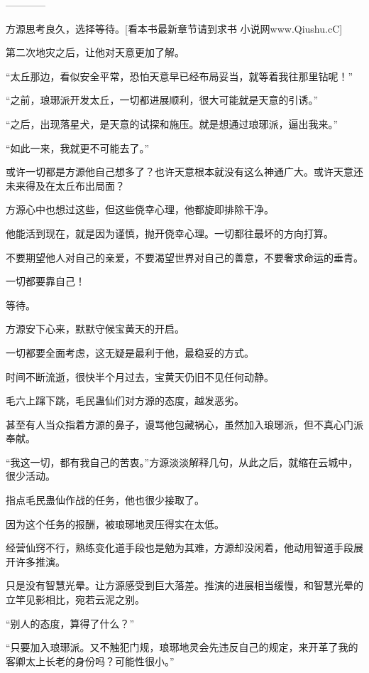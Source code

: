 
\begin{this_body}

------------

方源思考良久，选择等待。[看本书最新章节请到求书 小说网www.Qiushu.cC]

第二次地灾之后，让他对天意更加了解。

“太丘那边，看似安全平常，恐怕天意早已经布局妥当，就等着我往那里钻呢！”

“之前，琅琊派开发太丘，一切都进展顺利，很大可能就是天意的引诱。”

“之后，出现落星犬，是天意的试探和施压。就是想通过琅琊派，逼出我来。”

“如此一来，我就更不可能去了。”

或许一切都是方源他自己想多了？也许天意根本就没有这么神通广大。或许天意还未来得及在太丘布出局面？

方源心中也想过这些，但这些侥幸心理，他都旋即排除干净。

他能活到现在，就是因为谨慎，抛开侥幸心理。一切都往最坏的方向打算。

不要期望他人对自己的亲爱，不要渴望世界对自己的善意，不要奢求命运的垂青。

一切都要靠自己！

等待。

方源安下心来，默默守候宝黄天的开启。

一切都要全面考虑，这无疑是最利于他，最稳妥的方式。

时间不断流逝，很快半个月过去，宝黄天仍旧不见任何动静。

毛六上蹿下跳，毛民蛊仙们对方源的态度，越发恶劣。

甚至有人当众指着方源的鼻子，谩骂他包藏祸心，虽然加入琅琊派，但不真心门派奉献。

“我这一切，都有我自己的苦衷。”方源淡淡解释几句，从此之后，就缩在云城中，很少活动。

指点毛民蛊仙作战的任务，他也很少接取了。

因为这个任务的报酬，被琅琊地灵压得实在太低。

经营仙窍不行，熟练变化道手段也是勉为其难，方源却没闲着，他动用智道手段展开许多推演。

只是没有智慧光晕。让方源感受到巨大落差。推演的进展相当缓慢，和智慧光晕的立竿见影相比，宛若云泥之别。

“别人的态度，算得了什么？”

“只要加入琅琊派。又不触犯门规，琅琊地灵会先违反自己的规定，来开革了我的客卿太上长老的身份吗？可能性很小。”


\end{this_body}

